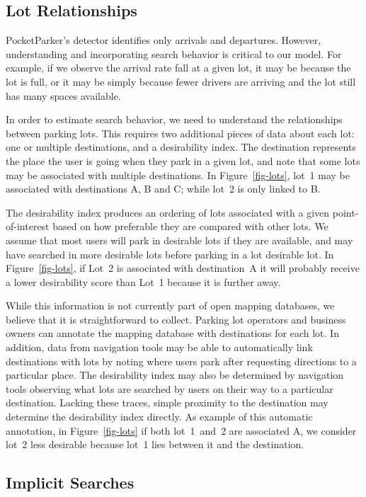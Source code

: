 \subsection{Lot Relationships}
\label{subsec-lots}

PocketParker's detector identifies only arrivals and departures. However,
understanding and incorporating search behavior is critical to our model. For
example, if we observe the arrival rate fall at a given lot, it may be
because the lot is full, or it may be simply because fewer drivers are
arriving and the lot still has many spaces available.

In order to estimate search behavior, we need to understand the relationships
between parking lots. This requires two additional pieces of data about each
lot: one or multiple destinations, and a desirability index. The destination
represents the place the user is going when they park in a given lot, and
note that some lots may be associated with multiple destinations. In
Figure~\ref{fig-lots}, lot~1 may be associated with destinations A, B and C;
while lot~2 is only linked to B.

The desirability index produces an ordering of lots associated with a given
point-of-interest based on how preferable they are compared with other lots.
We assume that most users will park in desirable lots if they are available,
and may have searched in more desirable lots before parking in a lot
desirable lot. In Figure~\ref{fig-lots}, if Lot~2 is associated with
destination~A it will probably receive a lower desirability score than Lot~1
because it is further away.

While this information is not currently part of open mapping databases, we
believe that it is straightforward to collect. Parking lot operators and
business owners can annotate the mapping database with destinations for each
lot. In addition, data from navigation tools may be able to automatically
link destinations with lots by noting where users park after requesting
directions to a particular place. The desirability index may also be
determined by navigation tools observing what lots are searched by users on
their way to a particular destination. Lacking these traces, simple proximity
to the destination may determine the desirability index directly. As example
of this automatic annotation, in Figure~\ref{fig-lots} if both lot~1~and~2
are associated A, we consider lot~2 less desirable because lot~1 lies between
it and the destination.

\subsection{Implicit Searches}
\label{subsec-implicit}

